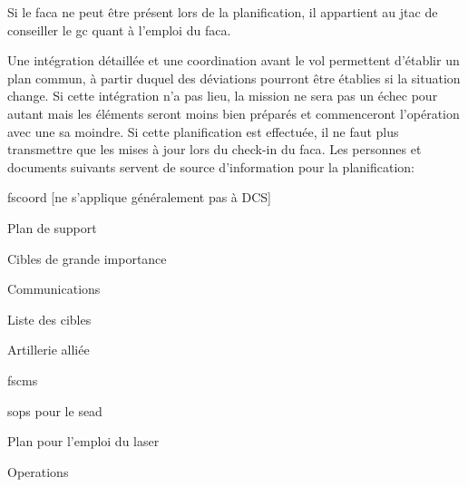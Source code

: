 \begin{e1}
\begin{e2}
		\item Si le \gls{faca} ne peut être présent lors de la planification, il appartient au \gls{jtac} de conseiller le \gls{gc} quant à l'emploi du \gls{faca}.
		\item Une intégration détaillée et une coordination avant le vol permettent d'établir un plan commun, à partir duquel des déviations pourront être établies si la situation change. Si cette intégration n'a pas lieu, la mission ne sera pas un échec pour autant mais les éléments seront moins bien préparés et commenceront l'opération avec une \gls{sa} moindre. Si cette planification est effectuée, il ne faut plus transmettre que les mises à jour lors du check-in du \gls{faca}. Les personnes et documents suivants servent de source d'information pour la planification:
		\begin{e3}
			\item \gls{fscoord} [ne s'applique généralement pas à DCS]
			\begin{e4}[0em]
				\item Plan de support
				\item Cibles de grande importance
				\item Communications
				\item Liste des cibles
				\item Artillerie alliée
				\item \glspl{fscm}
				\item \glspl{sop} pour le \gls{sead}
				\item Plan pour l'emploi du laser
			\end{e4}
			\begin{e4}
				\item Operations
				\begin{e5}

\end{e5}
\end{e4}
\end{e3}
\end{e2}
\end{e1}
